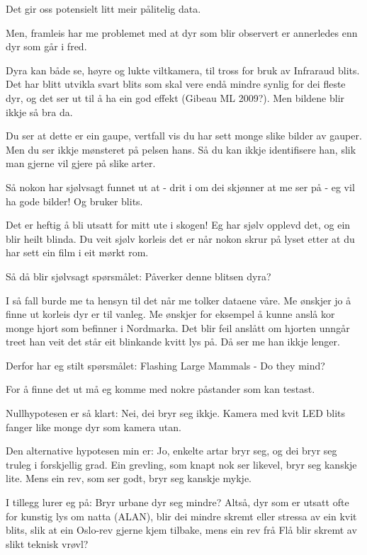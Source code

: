 Det gir oss potensielt litt meir pålitelig data.

Men, framleis har me problemet med at dyr som blir observert er annerledes enn dyr som går i fred. %

Dyra kan både se, høyre og lukte viltkamera, til tross for bruk av Infraraud blits. Det har blitt utvikla svart blits som skal vere endå mindre synlig for dei fleste dyr, og det ser ut til å ha ein god effekt (Gibeau ML 2009?). Men bildene blir ikkje så bra da.

Du ser at dette er ein gaupe, vertfall vis du har sett monge slike bilder av gauper. Men du ser ikkje mønsteret på pelsen hans. Så du kan ikkje identifisere han, slik man gjerne vil gjere på slike arter.

Så nokon har sjølvsagt funnet ut at - drit i om dei skjønner at me ser på - eg vil ha gode bilder! Og bruker blits.

Det er heftig å bli utsatt for mitt ute i skogen! Eg har sjølv opplevd det, og ein blir heilt blinda. Du veit sjølv korleis det er når nokon skrur på lyset etter at du har sett ein film i eit mørkt rom.



Så då blir sjølvsagt spørsmålet:  Påverker denne blitsen dyra?

I så fall burde me ta hensyn til det når me tolker dataene våre. Me ønskjer jo å finne ut korleis dyr er til vanleg.
Me ønskjer for eksempel å kunne anslå kor monge hjort som befinner i Nordmarka. Det blir feil anslått om hjorten unngår treet han veit det står eit blinkande kvitt lys på. Då ser me han ikkje lenger.

Derfor har eg stilt spørsmålet: Flashing Large Mammals - Do they mind?


For å finne det ut må eg komme med nokre påstander som kan testast.

Nullhypotesen er så klart: Nei, dei bryr seg ikkje. Kamera med kvit LED blits fanger like monge dyr som kamera utan.

Den alternative hypotesen min er: Jo, enkelte artar bryr seg, og dei bryr seg truleg i forskjellig grad. Ein grevling, som knapt nok ser likevel, bryr seg kanskje lite. Mens ein rev, som ser godt, bryr seg kanskje mykje.

I tillegg lurer eg på: Bryr urbane dyr seg mindre? Altså, dyr som er utsatt ofte for kunstig lys om natta (ALAN), blir dei mindre skremt eller stressa av ein kvit blits, slik at ein Oslo-rev gjerne kjem tilbake, mens ein rev frå Flå blir skremt av slikt teknisk vrøvl?


